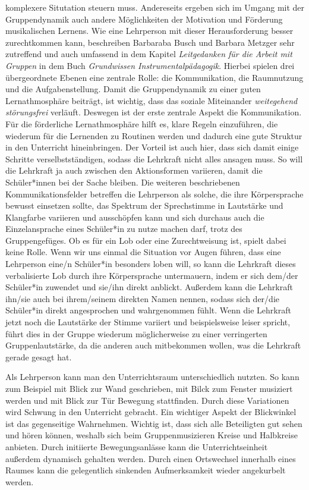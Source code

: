 komplexere Situtation steuern muss. Andereseits ergeben sich im Umgang mit der
Gruppendynamik auch andere Möglichkeiten der Motivation und Förderung
musikalischen Lernens. Wie eine Lehrperson mit dieser Herausforderung besser
zurechtkommen kann, beschreiben Barbaraba Busch und Barbara Metzger sehr
zutreffend und auch umfassend in dem Kapitel \emph{Leitgedanken für die Arbeit
mit Gruppen} in dem Buch \emph{Grundwissen Instrumentalpädagogik}. Hierbei
spielen drei übergeordnete Ebenen eine zentrale Rolle: die Kommunikation, die
Raumnutzung und die Aufgabenstellung. Damit die Gruppendynamik zu einer guten
Lernathmosphäre beiträgt, ist wichtig, dass das soziale Miteinander
\emph{weitegehend störungsfrei} verläuft. Deswegen ist der erste zentrale Aspekt
die Kommunikation. Für die förderliche Lernathmosphäre hilft es, klare Regeln
einzuführen, die wiederum für die Lernenden zu Routinen werden und dadurch eine
gute Struktur in den Unterricht hineinbringen. Der Vorteil ist auch hier, dass
sich damit einige Schritte verselbstständigen, sodass die Lehrkraft nicht alles
ansagen muss. So will die Lehrkraft ja auch zwischen den Aktionsformen
variieren, damit die Schüler*innen bei der Sache bleiben. Die weiteren
beschriebenen Kommunikationsfelder betreffen die Lehrperson als solche, die ihre
Körpersprache bewusst einsetzen sollte, das Spektrum der Sprechstimme in
Lautstärke und Klangfarbe variieren und ausschöpfen kann und sich durchaus auch
die Einzelansprache eines Schüler*in zu nutze machen darf, trotz des
Gruppengefüges. Ob es für ein Lob oder eine Zurechtweisung ist, spielt dabei
keine Rolle. Wenn wir uns einmal die Situation vor Augen führen, dass eine
Lehrperson eine/n Schüler*in besonders loben will, so kann die Lehrkraft dieses
verbalisierte Lob durch ihre Körpersprache untermauern, indem er sich dem/der
Schüler*in zuwendet und sie/ihn direkt anblickt. Außerdem kann die Lehrkraft
ihn/sie auch bei ihrem/seinem direkten Namen nennen, sodass sich der/die
Schüler*in direkt angesprochen und wahrgenommen fühlt. Wenn die Lehrkraft jetzt
noch die Lautstärke der Stimme variiert und beispielsweise leiser spricht, führt
dies in der Gruppe wiederum möglicherweise zu einer verringerten
Gruppenlautstärke, da die anderen auch mitbekommen wollen, was die Lehrkraft
gerade gesagt hat. 

Als Lehrperson kann man den Unterrichtsraum unterschiedlich nutzten. So kann zum
Beispiel mit Blick zur Wand geschrieben, mit Bilck zum Fenster musiziert werden
und mit Blick zur Tür Bewegung stattfinden. Durch diese Variationen wird Schwung
in den Unterricht gebracht. Ein wichtiger Aspekt der Blickwinkel ist das
gegenseitige Wahrnehmen. Wichtig ist, dass sich alle Beteiligten gut sehen und
hören können, weshalb sich beim Gruppenmusizieren Kreise und Halbkreise
anbieten. Durch initiierte Bewegungsanlässe kann die Unterrichtseinheit außerdem
dynamisch gehalten werden. Durch einen Ortswechsel innerhalb eines Raumes kann
die gelegentlich sinkenden Aufmerksamkeit wieder angekurbelt werden. 


